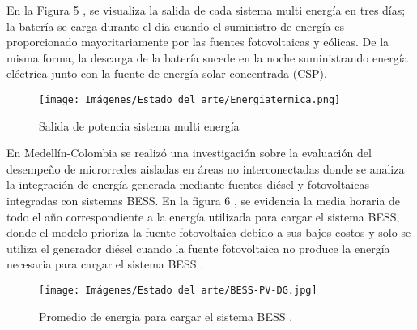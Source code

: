 En la Figura 5 , se visualiza la salida de cada sistema multi energía en tres días; la batería se carga durante el día cuando el suministro de energía es  proporcionado mayoritariamente por las fuentes fotovoltaicas y eólicas. De la misma forma, la descarga de la batería sucede en la noche suministrando energía eléctrica  junto con la fuente de energía solar concentrada (CSP).
\begin{figure}[h!]
    \begin{center}
    \centering
\texttt{[image: Imágenes/Estado del arte/Energiatermica.png]}
	\caption{Salida de potencia sistema multi energía
	\cite{li2019capacity}}
    \end{center}
\end{figure}
\newline
En Medellín-Colombia se realizó una investigación sobre la evaluación del desempeño de microrredes aisladas en áreas no interconectadas donde se analiza la integración de energía generada mediante fuentes diésel y fotovoltaicas integradas con sistemas BESS. En la figura 6 , se evidencia la media horaria de todo el año correspondiente a la energía utilizada para cargar el sistema BESS, donde el modelo prioriza la fuente fotovoltaica debido a sus bajos costos y solo se utiliza el generador diésel cuando la fuente fotovoltaica no produce la energía necesaria para cargar el sistema BESS \cite{ropero2022sizing}.
\newpage
\begin{figure}[h!]
    \begin{center}
    \centering
\texttt{[image: Imágenes/Estado del arte/BESS-PV-DG.jpg]}
	\caption{Promedio de energía para cargar el sistema BESS \cite{ropero2022sizing}.}
    \end{center}
\end{figure}

\smallskip

